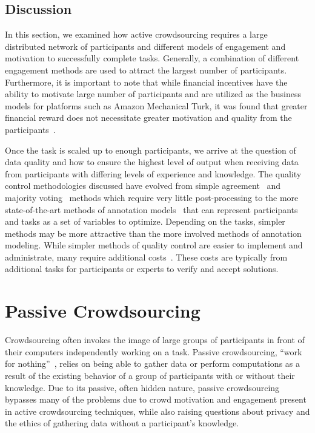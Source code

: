 \documentclass[10pt,twocolumn]{article}
\begin{document}
\subsection{Discussion}

In this section, we examined how active crowdsourcing requires a large 
distributed network of participants and different models of engagement 
and motivation to successfully complete tasks. Generally,
a combination of different engagement methods are used to attract
the largest number of participants. Furthermore, it is important to note 
that while financial incentives have the ability to motivate large number 
of participants and are utilized as the business models for platforms 
such as Amazon Mechanical Turk, it was found that greater financial 
reward does not necessitate greater motivation and quality from 
the participants~\cite{Mason2010a}.

Once the task is scaled up to enough participants, we arrive at 
the question of data quality and how to ensure the highest level of output
when receiving data from participants with differing levels of experience and 
knowledge. The quality control methodologies discussed have evolved from simple 
agreement~\cite{Law2009a,VonAhn2004} and majority 
voting~\cite{Sheng2008,VonAhn2008} methods which require very little 
post-processing to the more state-of-the-art methods of annotation 
models~\cite{Karger,Welinder} that can represent participants and 
tasks as a set of variables to optimize. Depending on the tasks, simpler
methods may be more attractive than the more involved methods of
annotation modeling. While simpler methods of quality 
control are easier to implement and administrate, many require additional 
costs~\cite{Sheng2008}. These costs are typically from additional tasks for 
participants or experts to verify and accept solutions.


\section{Passive Crowdsourcing}
\label{sec:passive}

Crowdsourcing often invokes the image of large groups of participants in 
front of their computers independently working on a task. Passive 
crowdsourcing, ``work for nothing''~\cite{Adar2011}, relies on being able 
to gather data or perform computations as a result of the existing behavior 
of a group of participants with or without their knowledge. Due to its 
passive, often hidden nature, passive crowdsourcing bypasses many of the 
problems due to crowd motivation and engagement present in active 
crowdsourcing techniques, while also raising questions about privacy
and the ethics of gathering data without a participant's knowledge.
\end{document}
